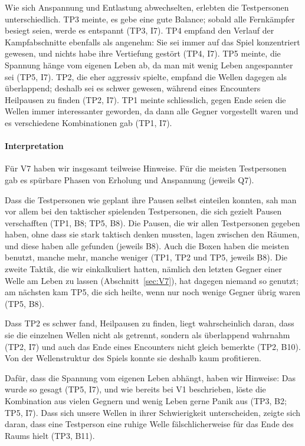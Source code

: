 \documentclass[../Main.tex]{subfiles}
\begin{document}
Wie sich Anspannung und Entlastung abwechselten, erlebten die Testpersonen unterschiedlich. TP3 meinte, es gebe eine gute Balance; sobald alle Fernkämpfer besiegt seien, werde es entspannt (TP3, I7). TP4 empfand den Verlauf der Kampfabschnitte ebenfalls als angenehm: Sie sei immer auf das Spiel konzentriert gewesen, und nichts habe ihre Vertiefung gestört (TP4, I7). TP5 meinte, die Spannung hänge vom eigenen Leben ab, da man mit wenig Leben angespannter sei (TP5, I7). TP2, die eher aggressiv spielte, empfand die Wellen dagegen als überlappend; deshalb sei es schwer gewesen, während eines Encounters Heilpausen zu finden (TP2, I7). TP1 meinte schliesslich, gegen Ende seien die Wellen immer interessanter geworden, da dann alle Gegner vorgestellt waren und es verschiedene Kombinationen gab (TP1, I7).

\paragraph{Interpretation}
Für V7 haben wir insgesamt teilweise Hinweise. Für die meisten Testpersonen gab es spürbare Phasen von Erholung und Anspannung (jeweils Q7).

Dass die Testpersonen wie geplant ihre Pausen selbst einteilen konnten, sah man vor allem bei den taktischer spielenden Testpersonen, die sich gezielt Pausen verschafften (TP1, B8; TP5, B8). Die Pausen, die wir allen Testpersonen gegeben haben, ohne dass sie stark taktisch denken mussten, lagen zwischen den Räumen, und diese haben alle gefunden (jeweils B8). Auch die Boxen haben die meisten benutzt, manche mehr, manche weniger (TP1, TP2 und TP5, jeweils B8). Die zweite Taktik, die wir einkalkuliert hatten, nämlich den letzten Gegner einer Welle am Leben zu lassen (Abschnitt~\ref{sec:V7}), hat dagegen niemand so genutzt; am nächsten kam TP5, die sich heilte, wenn nur noch wenige Gegner übrig waren (TP5, B8).

Dass TP2 es schwer fand, Heilpausen zu finden, liegt wahrscheinlich daran, dass sie die einzelnen Wellen nicht als getrennt, sondern als überlappend wahrnahm (TP2, I7) und auch das Ende eines Encounters nicht gleich bemerkte (TP2, B10). Von der Wellenstruktur des Spiels konnte sie deshalb kaum profitieren.

Dafür, dass die Spannung vom eigenen Leben abhängt, haben wir Hinweise: Das wurde so gesagt (TP5, I7), und wie bereits bei V1 beschrieben, löste die Kombination aus vielen Gegnern und wenig Leben gerne Panik aus (TP3, B2; TP5, I7). Dass sich unsere Wellen in ihrer Schwierigkeit unterscheiden, zeigte sich daran, dass eine Testperson eine ruhige Welle fälschlicherweise für das Ende des Raums hielt (TP3, B11).
\end{document}
